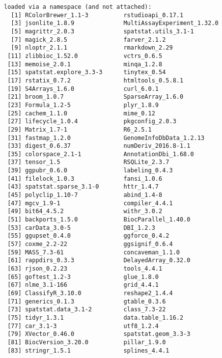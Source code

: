 \documentclass[
  letterpaper,
  DIV=11,
  numbers=noendperiod]{scrreprt}
\begin{document}
\begin{verbatim}
loaded via a namespace (and not attached):
  [1] RColorBrewer_1.1-3          rstudioapi_0.17.1          
  [3] jsonlite_1.8.9              MultiAssayExperiment_1.32.0
  [5] magrittr_2.0.3              spatstat.utils_3.1-1       
  [7] magick_2.8.5                farver_2.1.2               
  [9] nloptr_2.1.1                rmarkdown_2.29             
 [11] zlibbioc_1.52.0             vctrs_0.6.5                
 [13] memoise_2.0.1               minqa_1.2.8                
 [15] spatstat.explore_3.3-3      tinytex_0.54               
 [17] rstatix_0.7.2               htmltools_0.5.8.1          
 [19] S4Arrays_1.6.0              curl_6.0.1                 
 [21] broom_1.0.7                 SparseArray_1.6.0          
 [23] Formula_1.2-5               plyr_1.8.9                 
 [25] cachem_1.1.0                mime_0.12                  
 [27] lifecycle_1.0.4             pkgconfig_2.0.3            
 [29] Matrix_1.7-1                R6_2.5.1                   
 [31] fastmap_1.2.0               GenomeInfoDbData_1.2.13    
 [33] digest_0.6.37               numDeriv_2016.8-1.1        
 [35] colorspace_2.1-1            AnnotationDbi_1.68.0       
 [37] tensor_1.5                  RSQLite_2.3.7              
 [39] ggpubr_0.6.0                labeling_0.4.3             
 [41] filelock_1.0.3              fansi_1.0.6                
 [43] spatstat.sparse_3.1-0       httr_1.4.7                 
 [45] polyclip_1.10-7             abind_1.4-8                
 [47] mgcv_1.9-1                  compiler_4.4.1             
 [49] bit64_4.5.2                 withr_3.0.2                
 [51] backports_1.5.0             BiocParallel_1.40.0        
 [53] carData_3.0-5               DBI_1.2.3                  
 [55] ggupset_0.4.0               ggforce_0.4.2              
 [57] coxme_2.2-22                ggsignif_0.6.4             
 [59] MASS_7.3-61                 concaveman_1.1.0           
 [61] rappdirs_0.3.3              DelayedArray_0.32.0        
 [63] rjson_0.2.23                tools_4.4.1                
 [65] goftest_1.2-3               glue_1.8.0                 
 [67] nlme_3.1-166                grid_4.4.1                 
 [69] ClassifyR_3.10.0            reshape2_1.4.4             
 [71] generics_0.1.3              gtable_0.3.6               
 [73] spatstat.data_3.1-2         class_7.3-22               
 [75] tidyr_1.3.1                 data.table_1.16.2          
 [77] car_3.1-3                   utf8_1.2.4                 
 [79] XVector_0.46.0              spatstat.geom_3.3-3        
 [81] BiocVersion_3.20.0          pillar_1.9.0               
 [83] stringr_1.5.1               splines_4.4.1              

\end{verbatim}
\end{document}
